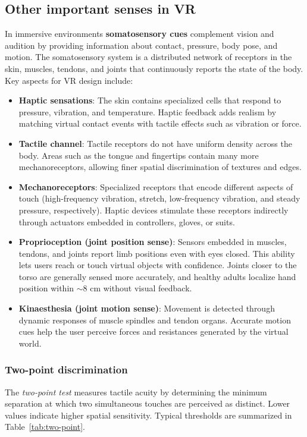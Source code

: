 \documentclass[11pt,a4paper]{article}
\theoremstyle{definition}
\theoremstyle{plain}
\theoremstyle{remark}
\begin{document}
\subsection{Other important senses in VR}
In immersive environments \textbf{somatosensory cues} complement vision and audition by providing information about contact, pressure, body pose, and motion. The somatosensory system is a distributed network of receptors in the skin, muscles, tendons, and joints that continuously reports the state of the body. Key aspects for VR design include:
\begin{itemize}
    \item \textbf{Haptic sensations}: The skin contains specialized cells that respond to pressure, vibration, and temperature. Haptic feedback adds realism by matching virtual contact events with tactile effects such as vibration or force.
    
    \item \textbf{Tactile channel}: Tactile receptors do not have uniform density across the body. Areas such as the tongue and fingertips contain many more mechanoreceptors, allowing finer spatial discrimination of textures and edges.
    
    \item \textbf{Mechanoreceptors}: Specialized receptors that encode different aspects of touch (high-frequency vibration, stretch, low-frequency vibration, and steady pressure, respectively). Haptic devices stimulate these receptors indirectly through actuators embedded in controllers, gloves, or suits.
    
    \item \textbf{Proprioception (joint position sense)}: Sensors embedded in muscles, tendons, and joints report limb positions even with eyes closed. This ability lets users reach or touch virtual objects with confidence. Joints closer to the torso are generally sensed more accurately, and healthy adults localize hand position within $\sim$8 cm without visual feedback.
    
    \item \textbf{Kinaesthesia (joint motion sense)}: Movement is detected through dynamic responses of muscle spindles and tendon organs. Accurate motion cues help the user perceive forces and resistances generated by the virtual world.
\end{itemize}

\subsubsection{Two-point discrimination}
The \textit{two-point test} measures tactile acuity by determining the minimum separation at which two simultaneous touches are perceived as distinct. Lower values indicate higher spatial sensitivity. Typical thresholds are summarized in Table~\ref{tab:two-point}.
\end{document}
